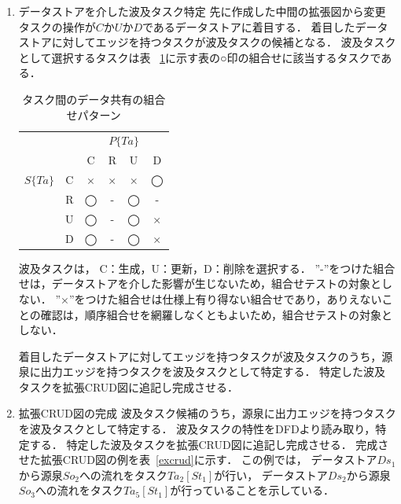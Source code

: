 \begin{enumerate}
\item データストアを介した波及タスク特定
先に作成した中間の拡張図から変更タスクの操作が$C$か$U$か$D$であるデータストアに着目する．
着目したデータストアに対してエッジを持つタスクが波及タスクの候補となる．
波及タスクとして選択するタスクは表 ~\ref{table:3}に示す表の○印の組合せに該当するタスクである．
\begin{table}[h]
\caption{タスク間のデータ共有の組合せパターン}
\label{table:3}
\begin{center}
\begin{tabular}{c|c||c|c|c|c}
\hline
\multicolumn{2}{c||}{}& \multicolumn{4}{c}{$P\{Ta\}$}\\
\multicolumn{2}{c||}{}& C & R & U& D\\
\hline\hline
$S\{Ta\}$&C&×&×&×&◯\\
\cline{2-6}
&R&◯&-&◯& -\\
\cline{2-6}
&U&◯&-&◯&×\\
\cline{2-6}
&D&◯&- &◯&×\\
\hline
\end{tabular}
\end{center}
\end{table}
波及タスクは， C：生成，U：更新，D：削除を選択する．
”-”をつけた組合せは，データストアを介した影響が生じないため，組合せテストの対象としない．
”×”をつけた組合せは仕様上有り得ない組合せであり，ありえないことの確認は，順序組合せを網羅しなくともよいため，組合せテストの対象としない．

着目したデータストアに対してエッジを持つタスクが波及タスクのうち，源泉に出力エッジを持つタスクを波及タスクとして特定する．
特定した波及タスクを拡張CRUD図に追記し完成させる．
\item 拡張CRUD図の完成
波及タスク候補のうち，源泉に出力エッジを持つタスクを波及タスクとして特定する．
波及タスクの特性をDFDより読み取り，特定する．
特定した波及タスクを拡張CRUD図に追記し完成させる．
完成させた拡張CRUD図の例を表~\ref{excrud}に示す．
この例では，
データストア$Ds_1$から源泉$So_2$への流れをタスク$Ta_2[St_1]$が行い，
データストア$Ds_2$から源泉$So_3$への流れをタスク$Ta_5[St_1]$が行っていることを示している．
\end{enumerate}
